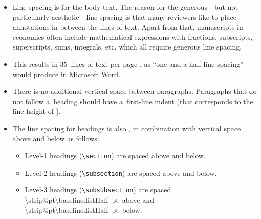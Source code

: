 \documentclass[12pt, a4paper, oneside]{article}
\newlength{\baselinedist}
\theoremstyle{Plain}
\theoremstyle{Definition}
\theoremstyle{Remark}
\begin{document}
\begin{itemize}
	\item Line spacing is \printlength{\baselinedist} for the body text. The reason for the generous---but not particularly aesthetic---line spacing is that many reviewers like to place annotations in-between the lines of text. Apart from that, manuscripts in economics often include mathematical expressions with fractions, subscripts, superscripts, sums, integrals, etc. which all require generous line spacing.
	\item This results in 35~lines of text per page
		\makeatletter%
		\ifdim \f@size pt < 11.5pt%
			(${35 \times 19.5\textup{~pt}} = 682.5\textup{~pt} = 24.08\textup{~cm}$)%
		\else%
			(${35 \times 20.7\textup{~pt}} = 724.5\textup{~pt} = 25.56\textup{~cm}$)%
		\fi%
		\makeatother%
		, as ``one-and-a-half line spacing'' would produce in Microsoft Word.
	\item There is no additional vertical space between paragraphs. Paragraphs that do not follow a~heading should have a~first-line indent (that corresponds to the line height of \printlength{\baselinedist}).
	\item The line spacing for headings is also \printlength{\baselinedist}, in combination with vertical space above and below as follows:
		\newlength{\baselinedistDouble}
		\setlength{\baselinedistDouble}{2\baselinedist}
		\newlength{\baselinedistHalf}
		\setlength{\baselinedistHalf}{0.5\baselinedist}
		\begin{itemize}
			\item Level-1 headings (\verb|\section|) are spaced \printlength{\baselinedistDouble} above and \printlength{\baselinedist} below.
			\item Level-2 headings (\verb|\subsection|) are spaced \printlength{\baselinedist} above and \printlength{\baselinedist} below.
			\item Level-3 headings (\verb|\subsubsection|) are spaced \makeatletter\SI[round-mode = places, round-precision = 2]{\strip@pt\baselinedistHalf}{pt}\makeatother\ above and \makeatletter\SI[round-mode = places, round-precision = 2]{\strip@pt\baselinedistHalf}{pt}\makeatother\ below.

\end{itemize}
\end{itemize}
\end{document}
